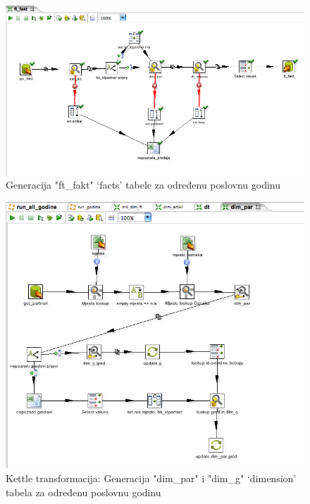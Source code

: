 \documentclass[times, utf8, seminar]{fit}
\begin{document}
\begin{figure}[H]
\centering
\includegraphics[width=15cm]{img/kettle_tr_ft_fakt.png}
\caption{Generacija "ft\_fakt" `facts' tabele za određenu poslovnu godinu}
\end{figure}


\begin{figure}[H]
\centering
\includegraphics[width=15cm]{img/kettle_tr_dim_par.png}
\caption{Kettle transformacija: Generacija "dim\_par" i "dim\_g" `dimension' tabela za određenu poslovnu godinu}
\end{figure}
\end{document}
